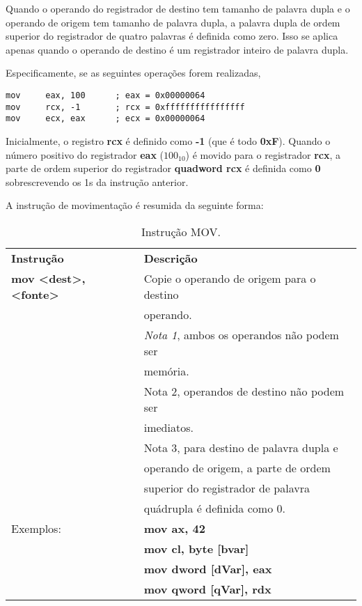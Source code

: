 Quando o operando do registrador de destino tem tamanho de palavra dupla e o operando de origem tem tamanho de palavra dupla, a palavra dupla de ordem superior do registrador de quatro palavras é definida como zero. Isso se aplica apenas quando o operando de destino é um registrador inteiro de palavra dupla.

Especificamente, se as seguintes operações forem realizadas,
\begin{verbatim}
mov 	eax, 100 	  ; eax = 0x00000064
mov 	rcx, -1  	  ; rcx = 0xffffffffffffffff
mov 	ecx, eax 	  ; ecx = 0x00000064
\end{verbatim}

Inicialmente, o registro \textbf{rcx} é definido como \textbf{-1} (que é todo \textbf{0xF}). Quando o número positivo do registrador \textbf{eax} ($ 100_{10}$) é movido para o registrador \textbf{rcx}, a parte de ordem superior do registrador \textbf{quadword rcx} é definida como \textbf{0} sobrescrevendo os 1s da instrução anterior.

A instrução de movimentação é resumida da seguinte forma:
\begin{table}[ht]
	\begin{center}
			\begin{tabular}{|ll|}
				\hline
				\rowcolor[HTML]{C0C0C0}
				\textbf{Instrução} & \textbf{Descrição} \\ 
				\textbf{mov <dest>, <fonte>} & Copie o operando de origem para o destino\\
				& operando.\\
				& \textit{Nota 1}, ambos os operandos não podem ser\\
				& memória.\\
				&Nota 2, operandos de destino não podem ser\\
				& imediatos.\\
				&Nota 3, para destino de palavra dupla e\\
				& operando de origem, a parte de ordem \\
				&superior do registrador de palavra \\
				&quádrupla é definida como 0. \\ \hline
		Exemplos:& \textbf{mov ax, 42}\\
		& \textbf{mov cl, byte [bvar]}\\
		& \textbf{mov dword [dVar], eax}\\
		& \textbf{mov qword [qVar], rdx}\\ \hline				
		\end{tabular}%
	\end{center}
	\caption{Instrução MOV.}
	\label{tab:mov}
\end{table}

